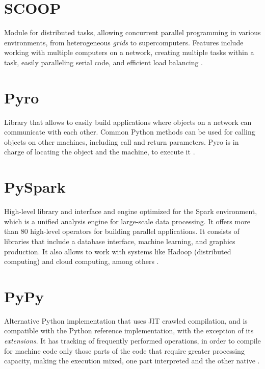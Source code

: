 \section{SCOOP}

Module for distributed tasks, allowing concurrent parallel programming in various environments, from heterogeneous \textit{grids} to supercomputers. Features include working with multiple computers on a network, creating multiple tasks within a task, easily paralleling serial code, and efficient load balancing \cite{Hold2014}.




\section{Pyro}

Library that allows to easily build applications where objects on a network can communicate with each other. Common Python methods can be used for calling objects on other machines, including call and return parameters. Pyro is in charge of locating the object and the machine, to execute it \cite{Blank2003}.




\section{PySpark}

High-level library and interface and engine optimized for the Spark environment, which is a unified analysis engine for large-scale data processing. It offers more than 80 high-level operators for building parallel applications. It consists of libraries that include a database interface, machine learning, and graphics production. It also allows to work with systems like Hadoop (distributed computing) and cloud computing, among others \cite{Drabas2017}.




\section{PyPy}

Alternative Python implementation that uses JIT crawled compilation, and is compatible with the Python reference implementation, with the exception of its \textit{extensions}. It has tracking of frequently performed operations, in order to compile for machine code only those parts of the code that require greater processing capacity, making the execution mixed, one part interpreted and the other native \cite{Biham2006}.




